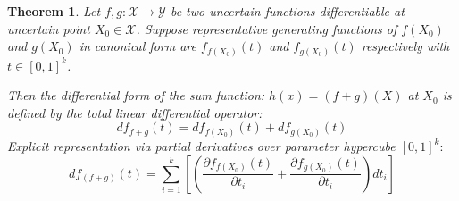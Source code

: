 \documentclass[a4paper,12pt,twoside]{memoir}
\newtheorem{theorem}{Theorem}[chapter]
\begin{document}
	\begin{theorem}
		Let $f,g : \mathcal{X} \to \mathcal{Y}$ be two uncertain functions differentiable at uncertain point $X_0 \in \mathcal{X}$. Suppose representative generating functions of $f(X_0)$ and $g(X_0)$ in canonical form are $f_{f(X_0)}(t)$ and $f_{g(X_0)}(t)$ respectively with $t \in [0,1]^k$.
		
		Then the differential form of the sum function:
		$h(x) = (f+g)(X)$ at $X_0$ is defined by the total linear differential operator:
		\[df_{f+g}(t) = df_{f(X_0)}(t) + df_{g(X_0)}(t)\]
		Explicit representation via partial derivatives over parameter hypercube $[0,1]^k:$
		\[df_{\left(f+g\right)}(t) = \sum_{i=1}^{k}\left[ \left(\frac{\partial f_{f(X_0)}(t)}{\partial t_i} + \frac{\partial f_{g(X_0)}(t)}{\partial t_i}\right) dt_i\right]\]
	\end{theorem}
\end{document}
